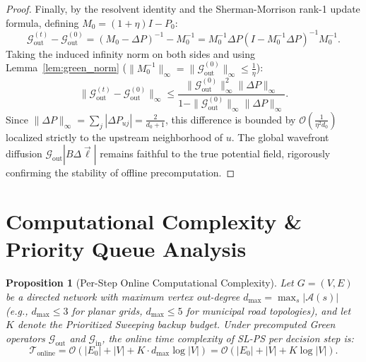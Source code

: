 \documentclass[11pt,a4paper]{article}
\newtheorem{proposition}{Proposition}
\begin{document}
\begin{proof}
Finally, by the resolvent identity and the Sherman-Morrison rank-1 update formula, defining $M_0 = (1 + \eta)I - P_0$:
\begin{equation}
\mathcal{G}_{\text{out}}^{(t)} - \mathcal{G}_{\text{out}}^{(0)} = \left( M_0 - \Delta P \right)^{-1} - M_0^{-1} = M_0^{-1} \Delta P \left( I - M_0^{-1} \Delta P \right)^{-1} M_0^{-1}.
\end{equation}
Taking the induced infinity norm on both sides and using Lemma~\ref{lem:green_norm} ($\|M_0^{-1}\|_\infty = \|\mathcal{G}_{\text{out}}^{(0)}\|_\infty \le \frac{1}{\eta}$):
\begin{equation}
\|\mathcal{G}_{\text{out}}^{(t)} - \mathcal{G}_{\text{out}}^{(0)}\|_\infty \le \frac{\|\mathcal{G}_{\text{out}}^{(0)}\|_\infty^2 \|\Delta P\|_\infty}{1 - \|\mathcal{G}_{\text{out}}^{(0)}\|_\infty \|\Delta P\|_\infty}.
\end{equation}
Since $\|\Delta P\|_\infty = \sum_j |\Delta P_{uj}| = \frac{2}{d_0 + 1}$, this difference is bounded by $\mathcal{O}\left( \frac{1}{\eta^2 d_0} \right)$ localized strictly to the upstream neighborhood of $u$. The global wavefront diffusion $\mathcal{G}_{\text{out}} |B \Delta \vec{\ell}|$ remains faithful to the true potential field, rigorously confirming the stability of offline precomputation.
\end{proof}

\section{Computational Complexity \& Priority Queue Analysis}
\label{sec:appendix_complexity}

\begin{proposition}[Per-Step Online Computational Complexity]
\label{prop:complexity}
Let $G = (V, E)$ be a directed network with maximum vertex out-degree $d_{\max} = \max_{s} |\mathcal{A}(s)|$ (e.g., $d_{\max} \le 3$ for planar grids, $d_{\max} \le 5$ for municipal road topologies), and let $K$ denote the Prioritized Sweeping backup budget. Under precomputed Green operators $\mathcal{G}_{\text{out}}$ and $\mathcal{G}_{\text{in}}$, the online time complexity of SL-PS per decision step is:
\begin{equation}
\mathcal{T}_{\text{online}} = \mathcal{O}\left( |E_0| + |V| + K \cdot d_{\max} \log |V| \right) = \mathcal{O}(|E_0| + |V| + K \log |V|).
\end{equation}
\end{proposition}
\end{document}
